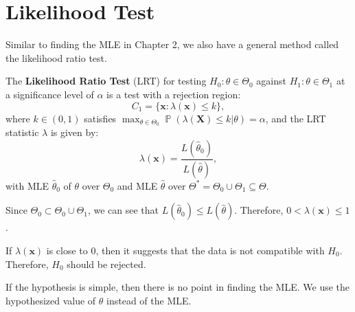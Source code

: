 \documentclass{huhtakm-template-book-v2}
\DeclareMathOperator{\prob}{\mathbb{P}}
\begin{document}
\section{Likelihood Test}
    Similar to finding the MLE in Chapter 2, we also have a general method called the likelihood ratio test.
    \begin{defn}
        The \textbf{Likelihood Ratio Test} (LRT) for testing $H_{0}:\theta\in\Theta_{0}$ against $H_{1}:\theta\in\Theta_{1}$ at a significance level of $\alpha$ is a test with a rejection region:
        \begin{equation*}
            C_{1}=\{\mathbf{x}:\lambda(\mathbf{x})\leq k\},
        \end{equation*}
        where $k\in(0,1)$ satisfies $\max_{\theta\in\Theta_{0}}\prob(\lambda(\mathbf{X})\leq k|\theta)=\alpha$, and the LRT statistic $\lambda$ is given by:
        \begin{equation*}
            \lambda(\mathbf{x})=\frac{L(\hat{\theta}_{0})}{L(\hat{\theta})},
        \end{equation*}
        with MLE $\hat{\theta}_{0}$ of $\theta$ over $\Theta_{0}$ and MLE $\hat{\theta}$ over $\Theta^{*}=\Theta_{0}\cup\Theta_{1}\subseteq\Theta$.
    \end{defn}
    \begin{rem}
        Since $\Theta_{0}\subset\Theta_{0}\cup\Theta_{1}$, we can see that $L(\hat{\theta}_{0})\leq L(\hat{\theta})$. Therefore, $0<\lambda(\mathbf{x})\leq 1$.
    \end{rem}
    \begin{rem}
        If $\lambda(\mathbf{x})$ is close to $0$, then it suggests that the data is not compatible with $H_{0}$. Therefore, $H_{0}$ should be rejected.
    \end{rem}
    \begin{rem}
        If the hypothesis is simple, then there is no point in finding the MLE. We use the hypothesized value of $\theta$ instead of the MLE.
    \end{rem}
\end{document}
